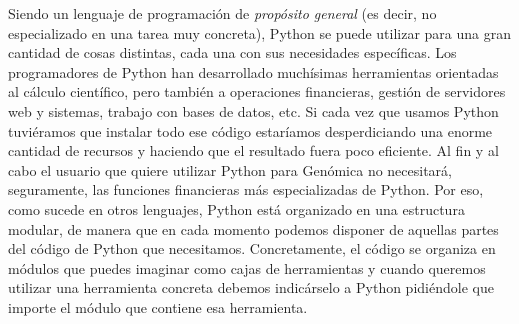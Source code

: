 \documentclass[10pt,a4paper]{article}\usepackage[]{graphicx}\usepackage[]{color}
\newcounter {cont01}
\begin{document}
Siendo un lenguaje de programación de {\em propósito general} (es decir, no especializado en una tarea muy concreta), Python se puede utilizar para una gran cantidad de cosas distintas, cada una con sus necesidades específicas. Los programadores de Python han desarrollado muchísimas herramientas orientadas al cálculo científico, pero también a operaciones financieras, gestión de servidores web y sistemas, trabajo con bases de datos, etc. Si cada vez que usamos Python tuviéramos que instalar todo ese código estaríamos desperdiciando una enorme cantidad de recursos y haciendo que el resultado fuera poco eficiente. Al fin y al cabo el usuario que quiere utilizar Python para Genómica no necesitará, seguramente, las funciones financieras más especializadas de Python. Por eso, como sucede en otros lenguajes, Python está organizado en una estructura modular, de manera que en cada momento podemos disponer de aquellas partes del código de Python que necesitamos. Concretamente, el código se organiza en {\sf módulos} que puedes imaginar como cajas de herramientas y cuando queremos utilizar una herramienta concreta debemos indicárselo a Python pidiéndole que {\sf importe} el módulo que contiene esa herramienta.
\end{document}
